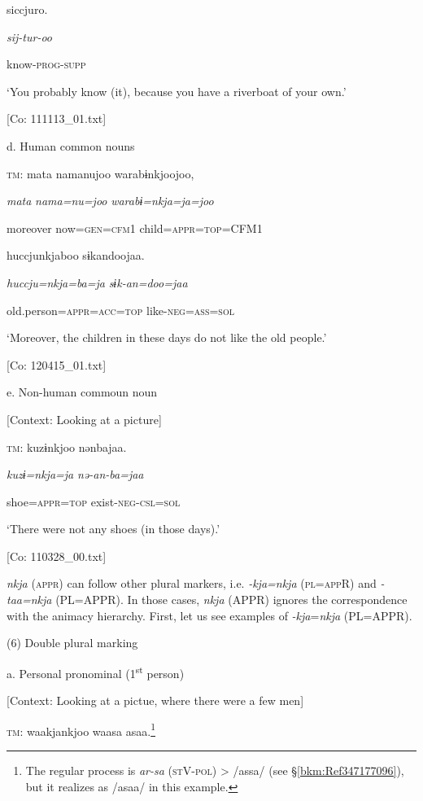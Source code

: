       siccjuro.

      \textit{sij-tur-oo}

      know-\textsc{prog}-\textsc{supp}

      ‘You probably know (it), because you have a riverboat of your own.’

      [Co: 111113\_01.txt]

  d.  Human common nouns

    \textsc{tm}:  mata  namanujoo  warabɨnkjoojoo,

      \textit{mata}  \textit{nama=nu=joo}  \textit{warabɨ=nkja=ja=joo}

      moreover  now=\textsc{gen}=\textsc{cfm}1  child=\textsc{appr}=\textsc{top}=CFM1

      huccjunkjaboo  sɨkandoojaa.

      \textit{huccju=nkja=ba=ja}  \textit{sɨk-an=doo=jaa}

      old.person=\textsc{appr}=\textsc{acc}=\textsc{top}  like-\textsc{neg}=\textsc{ass}=\textsc{sol}

      ‘Moreover, the children in these days do not like the old people.’

      [Co: 120415\_01.txt]

  e.  Non-human commoun noun

    [Context: Looking at a picture]

    \textsc{tm}:  kuzɨnkjoo  nənbajaa.

      \textit{kuzɨ=nkja=ja}  \textit{nə-an-ba=jaa}

      shoe=\textsc{appr}=\textsc{top}  exist-\textsc{neg}-\textsc{csl}=\textsc{sol}

      ‘There were not any shoes (in those days).’

      [Co: 110328\_00.txt]

  \textit{nkja} (\textsc{appr}) can follow other plural markers, i.e. \textit{{}-kja=nkja} (\textsc{pl}=\textsc{app}R) and \textit{{}-taa=nkja} (PL=APPR). In those cases, \textit{nkja} (APPR) ignores the correspondence with the animacy hierarchy. First, let us see examples of \textit{{}-kja}=\textit{nkja} (PL=APPR).

(6)  Double plural marking

  a.  Personal pronominal (1\textsuperscript{st} person)

    [Context: Looking at a pictue, where there were a few men]

    \textsc{tm}:  waakjankjoo  waasa  asaa.\footnote{The regular process is \textit{ar-sa} (\textsc{st}V-\textsc{pol}) > /assa/ (see §\ref{bkm:Ref347177096}), but it realizes as /asaa/ in this example.}

